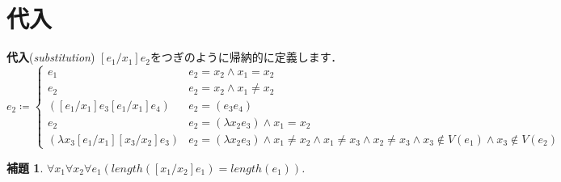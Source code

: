 \documentclass{ltjsbook}%
\newtheorem{lemma}{補題}[section]%
\newcommand\term[2]{\textbf{#1}{(\textit{#2})}}%
\begin{document}
\section{代入}%
\label{untyped:subst}%
\par\term{代入}{substitution}%
$[\mathit{e}_1/\mathit{x}_1]\mathit{e}_2$をつぎのように帰納的に定義します．%
\begin{equation}%
  [\mathit{e}_1/\mathit{x}_1]\mathit{e}_2 \coloneqq \begin{cases}%
    \mathit{e}_1 & \mathit{e}_2 = \mathit{x}_2\land\mathit{x}_1=\mathit{x}_2\\%
    \mathit{e}_2%
    & \mathit{e}_2 = \mathit{x}_2\land\mathit{x}_1\neq\mathit{x}_2\\%
    ([\mathit{e}_1/\mathit{x}_1]\mathit{e}_3%
      [\mathit{e}_1/\mathit{x}_1]\mathit{e}_4)%
    & \mathit{e}_2 = (\mathit{e}_3\mathit{e}_4)\\%
    \mathit{e}_2%
    & \mathit{e}_2 = (\lambda\mathit{x}_2\mathit{e}_3)%
    \land \mathit{x}_1 = \mathit{x}_2\\%
    (\lambda\mathit{x}_3[\mathit{e}_1/\mathit{x}_1][\mathit{x}_3/\mathit{x}_2]%
    \mathit{e}_3)%
    & \mathit{e}_2 = (\lambda\mathit{x}_2\mathit{e}_3)%
    \land \mathit{x}_1 \neq \mathit{x}_2%
    \land\mathit{x}_1\neq\mathit{x}_3%
    \land\mathit{x}_2\neq\mathit{x}_3%
    \land\mathit{x}_3\not\in V(\mathit{e}_1)%
    \land\mathit{x}_3\not\in V(\mathit{e}_2)%
  \end{cases}%
\end{equation}%
\begin{lemma}%
  \label{lemma:subst_len}%
  $\forall\mathit{x}_1\forall\mathit{x}_2\forall\mathit{e}_1%
  (length([\mathit{x}_1/\mathit{x}_2]\mathit{e}_1)=length(\mathit{e}_1))$.%
\end{lemma}%
\end{document}
